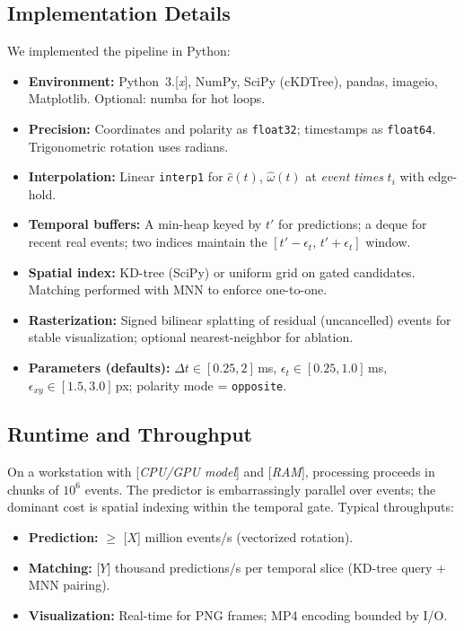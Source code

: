 \subsection{Implementation Details}
We implemented the pipeline in Python:
\begin{itemize}
  \item \textbf{Environment:} Python~3.[\textit{x}], NumPy, SciPy (cKDTree), pandas, imageio, Matplotlib. Optional: numba for hot loops.
  \item \textbf{Precision:} Coordinates and polarity as \texttt{float32}; timestamps as \texttt{float64}. Trigonometric rotation uses radians.
  \item \textbf{Interpolation:} Linear \texttt{interp1} for $\hat c(t)$, $\hat\omega(t)$ at \emph{event times} $t_i$ with edge-hold.
  \item \textbf{Temporal buffers:} A min-heap keyed by $t'$ for predictions; a deque for recent real events; two indices maintain the $[t'-\epsilon_t,\,t'+\epsilon_t]$ window.
  \item \textbf{Spatial index:} KD-tree (SciPy) or uniform grid on gated candidates. Matching performed with MNN to enforce one-to-one.
  \item \textbf{Rasterization:} Signed bilinear splatting of residual (uncancelled) events for stable visualization; optional nearest-neighbor for ablation.
  \item \textbf{Parameters (defaults):} $\Delta t \in [0.25, 2]$\,ms, $\epsilon_t \in [0.25, 1.0]$\,ms, $\epsilon_{xy}\in [1.5, 3.0]$\,px; polarity mode = \texttt{opposite}.
\end{itemize}

\subsection{Runtime and Throughput}
On a workstation with [\textit{CPU/GPU model}] and [\textit{RAM}], processing proceeds in chunks of $10^6$ events. The predictor is embarrassingly parallel over events; the dominant cost is spatial indexing within the temporal gate. Typical throughputs:

\begin{itemize}
  \item \textbf{Prediction:} $\geq$ [\textit{$X$}] million events/s (vectorized rotation).
  \item \textbf{Matching:} [\textit{$Y$}] thousand predictions/s per temporal slice (KD-tree query + MNN pairing).
  \item \textbf{Visualization:} Real-time for PNG frames; MP4 encoding bounded by I/O.
\end{itemize}

